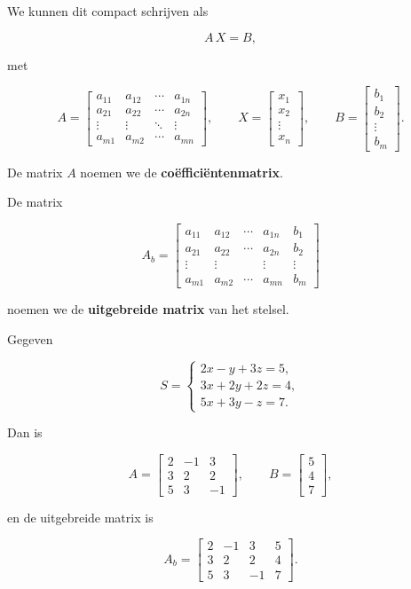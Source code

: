 \documentclass{ximera}
\begin{document}
We kunnen dit compact schrijven als

\[
A\,X=B,
\]

met

\[
A=
\begin{bmatrix}
a_{11}&a_{12}&\cdots&a_{1n}\\
a_{21}&a_{22}&\cdots&a_{2n}\\
\vdots&\vdots&\ddots&\vdots\\
a_{m1}&a_{m2}&\cdots&a_{mn}
\end{bmatrix},
\qquad
X=
\begin{bmatrix}
x_1\\x_2\\\vdots\\x_n
\end{bmatrix},
\qquad
B=
\begin{bmatrix}
b_1\\b_2\\\vdots\\b_m
\end{bmatrix}.
\]


\begin{definitie}
De matrix \(A\) noemen we de \textbf{coëfficiëntenmatrix}.

De matrix

\[
A_b=
\left[
\begin{array}{cccc|c}
a_{11}&a_{12}&\cdots&a_{1n}&b_1\\
a_{21}&a_{22}&\cdots&a_{2n}&b_2\\
\vdots&\vdots&&\vdots&\vdots\\
a_{m1}&a_{m2}&\cdots&a_{mn}&b_m
\end{array}
\right]
\]

noemen we de \textbf{uitgebreide matrix} van het stelsel.
\end{definitie}


\begin{voorbeeld}

Gegeven

\[
S=
\begin{cases}
2x-y+3z=5,\\
3x+2y+2z=4,\\
5x+3y-z=7.
\end{cases}
\]

Dan is

\[
A=
\begin{bmatrix}
2&-1&3\\
3&2&2\\
5&3&-1
\end{bmatrix},
\qquad
B=
\begin{bmatrix}
5\\4\\7
\end{bmatrix},
\]

en de uitgebreide matrix is

\[
A_b=
\left[
\begin{array}{ccc|c}
2&-1&3&5\\
3&2&2&4\\
5&3&-1&7
\end{array}
\right].
\]

\end{voorbeeld}
\end{document}
